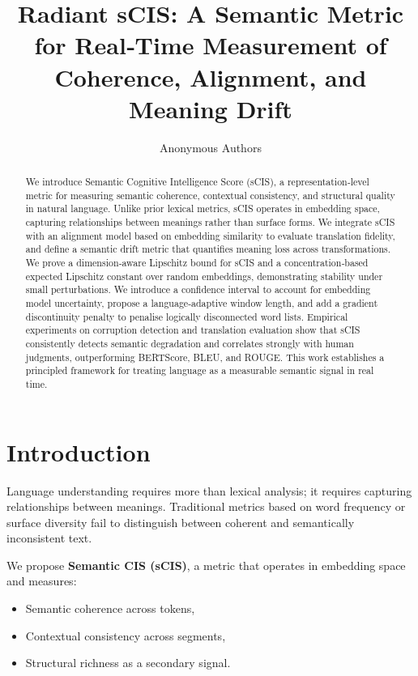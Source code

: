 \documentclass[11pt]{article}
\title{\textbf{Radiant sCIS:} A Semantic Metric for Real‑Time Measurement of Coherence, Alignment, and Meaning Drift}
\author{Anonymous Authors}
\date{}
\theoremstyle{definition}
\begin{document}
\maketitle

\begin{abstract}
We introduce Semantic Cognitive Intelligence Score (sCIS), a representation‑level metric for measuring semantic coherence, contextual consistency, and structural quality in natural language. Unlike prior lexical metrics, sCIS operates in embedding space, capturing relationships between meanings rather than surface forms. We integrate sCIS with an alignment model based on embedding similarity to evaluate translation fidelity, and define a semantic drift metric that quantifies meaning loss across transformations. We prove a dimension‑aware Lipschitz bound for sCIS and a concentration‑based expected Lipschitz constant over random embeddings, demonstrating stability under small perturbations. We introduce a confidence interval to account for embedding model uncertainty, propose a language‑adaptive window length, and add a gradient discontinuity penalty to penalise logically disconnected word lists. Empirical experiments on corruption detection and translation evaluation show that sCIS consistently detects semantic degradation and correlates strongly with human judgments, outperforming BERTScore, BLEU, and ROUGE. This work establishes a principled framework for treating language as a measurable semantic signal in real time.
\end{abstract}

\section{Introduction}

Language understanding requires more than lexical analysis; it requires capturing relationships between meanings. Traditional metrics based on word frequency or surface diversity fail to distinguish between coherent and semantically inconsistent text.

We propose \textbf{Semantic CIS (sCIS)}, a metric that operates in embedding space and measures:
\begin{itemize}[noitemsep]
    \item Semantic coherence across tokens,
    \item Contextual consistency across segments,
    \item Structural richness as a secondary signal.
\end{itemize}
\end{document}
